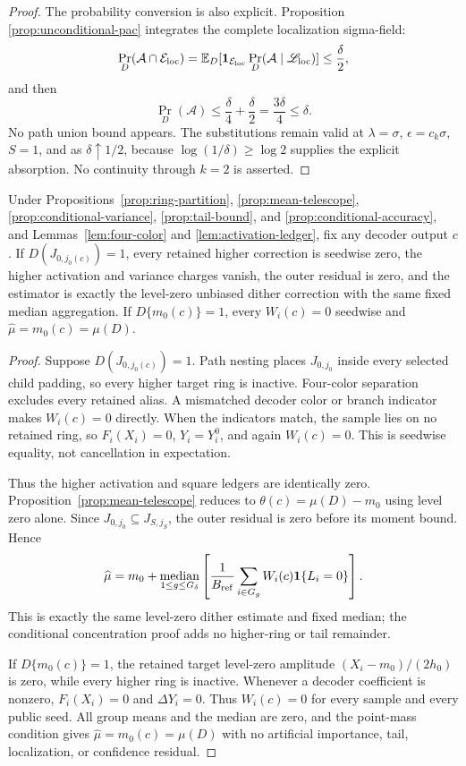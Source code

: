 \begin{proof}
The probability conversion is also explicit.  Proposition~
\ref{prop:unconditional-pac} integrates the complete localization sigma-field:
\[
 \Pr_D(\mathcal A\cap\mathcal E_{\rm loc})
 =\mathbb E_D[\mathbf1_{\mathcal E_{\rm loc}}
 \Pr_D(\mathcal A\mid\mathscr L_{\rm loc})]\leq\frac\delta2,
\]
and then
\[
 \Pr_D(\mathcal A)\leq\frac\delta4+\frac\delta2
 =\frac{3\delta}{4}\leq\delta.
\]
No path union bound appears.  The substitutions remain valid at
$\lambda=\sigma$, $\epsilon=c_k\sigma$, $S=1$, and as
$\delta\uparrow1/2$, because $\log(1/\delta)\geq\log2$ supplies the explicit
absorption.  No continuity through $k=2$ is asserted.
\end{proof}

\begin{proposition}
\label{prop:baseline-reductions}
Under Propositions~\ref{prop:ring-partition}, \ref{prop:mean-telescope},
\ref{prop:conditional-variance}, \ref{prop:tail-bound}, and
\ref{prop:conditional-accuracy}, and Lemmas~\ref{lem:four-color} and
\ref{lem:activation-ledger}, fix any decoder output $c$.  If
$D(J_{0,j_0(c)})=1$, every retained higher correction is seedwise zero, the
higher activation and variance charges vanish, the outer residual is zero,
and the estimator is exactly the level-zero unbiased dither correction with
the same fixed median aggregation.  If $D\{m_0(c)\}=1$, every $W_i(c)=0$
seedwise and $\widehat\mu=m_0(c)=\mu(D)$.
\end{proposition}

\begin{proof}
Suppose $D(J_{0,j_0(c)})=1$.  Path nesting places $J_{0,j_0}$ inside every
selected child padding, so every higher target ring is inactive.  Four-color
separation excludes every retained alias.  A mismatched decoder color or
branch indicator makes $W_i(c)=0$ directly.  When the indicators match, the
sample lies on no retained ring, so $F_i(X_i)=0$, $Y_i=Y_i^0$, and again
$W_i(c)=0$.  This is seedwise equality, not cancellation in expectation.

Thus the higher activation and square ledgers are identically zero.
Proposition~\ref{prop:mean-telescope} reduces to
$\theta(c)=\mu(D)-m_0$ using level zero alone.  Since
$J_{0,j_0}\subseteq J_{S,j_S}$, the outer residual is zero before its
moment bound.  Hence
\[
 \widehat\mu=m_0+\mathop{\rm median}_{1\leq g\leq G_\delta}
 \left[\frac1{B_{\rm ref}}\sum_{i\in G_g}
 W_i(c)\mathbf1\{L_i=0\}\right].
\]
This is exactly the same level-zero dither estimate and fixed median; the
conditional concentration proof adds no higher-ring or tail remainder.

If $D\{m_0(c)\}=1$, the retained target level-zero amplitude
$(X_i-m_0)/(2h_0)$ is zero, while every higher ring is inactive.  Whenever a
decoder coefficient is nonzero, $F_i(X_i)=0$ and $\Delta Y_i=0$.  Thus
$W_i(c)=0$ for every sample and every public seed.  All group means and the
median are zero, and the point-mass condition gives
$\widehat\mu=m_0(c)=\mu(D)$ with no artificial importance, tail,
localization, or confidence residual.
\end{proof}

